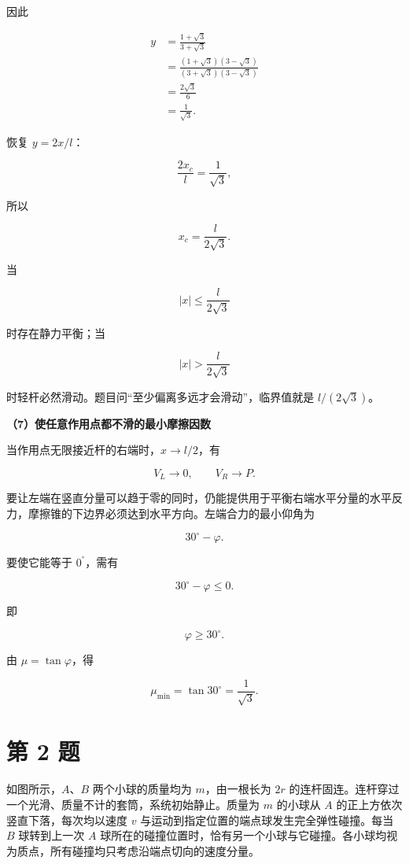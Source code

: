 \documentclass[12pt,a4paper,UTF8]{ctexart}
\begin{document}
因此

\[
\begin{aligned}
y
&=\frac{1+\sqrt3}{3+\sqrt3}\\
&=\frac{(1+\sqrt3)(3-\sqrt3)}{(3+\sqrt3)(3-\sqrt3)}\\
&=\frac{2\sqrt3}{6}\\
&=\frac1{\sqrt3}.
\end{aligned}
\]

恢复 \(y=2x/l\)：

\[
\frac{2x_c}{l}=\frac1{\sqrt3},
\]

所以

\[
\boxed{x_c=\frac{l}{2\sqrt3}}.
\]

当

\[|x|\le\frac{l}{2\sqrt3}\]

时存在静力平衡；当

\[
\boxed{|x|>\frac{l}{2\sqrt3}}
\]

时轻杆必然滑动。题目问``至少偏离多远才会滑动''，临界值就是
\(l/(2\sqrt3)\)。

\textbf{（7）使任意作用点都不滑的最小摩擦因数}

当作用点无限接近杆的右端时，\(x\to l/2\)，有

\[V_L\to0,
\qquad
V_R\to P.
\]

要让左端在竖直分量可以趋于零的同时，仍能提供用于平衡右端水平分量的水平反力，摩擦锥的下边界必须达到水平方向。左端合力的最小仰角为

\[30^\circ-\varphi.\]

要使它能等于 \(0^°\)，需有

\[
30^\circ-\varphi\le0.
\]

即

\[
\varphi\ge30^\circ.
\]

由 \(\mu=\tan\varphi\)，得

\[
\boxed{\mu_{\min}=\tan30^\circ=\frac1{\sqrt3}}.
\]

\newpage

\section{第 2 题}\label{ux7b2c-2-ux9898}

如图所示，\(A\)、\(B\) 两个小球的质量均为 \(m\)，由一根长为 \(2r\)
的连杆固连。连杆穿过一个光滑、质量不计的套筒，系统初始静止。质量为 \(m\)
的小球从 \(A\) 的正上方依次竖直下落，每次均以速度 \(v\)
与运动到指定位置的端点球发生完全弹性碰撞。每当 \(B\) 球转到上一次 \(A\)
球所在的碰撞位置时，恰有另一个小球与它碰撞。各小球均视为质点，所有碰撞均只考虑沿端点切向的速度分量。
\end{document}
